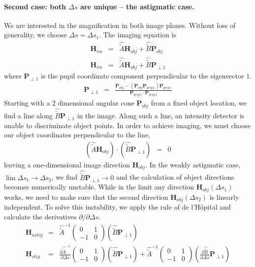 \documentclass[12pt,a4paper,twoside,openright,BCOR10mm,headsepline,titlepage,abstracton,chapterprefix,final]{scrreprt}
\newcommand\Vector[1]{{\mathbf{#1}}}
\begin{document}
\paragraph{Second case: both $\Delta s$ are unique -- the astigmatic case.}
We are interested in the magnification in both image planes. 
Without loss of generality, we choose $\Delta s = \Delta s_1$.
The imaging equation is
\begin{eqnarray}
 \Vector{H}_{im} &=& \hat{\tilde{A}} \Vector{H}_{obj} + \hat{\tilde{B}} \Vector{P}_{obj} \\
 \Vector{H}_{im} &=& \hat{\tilde{A}} \Vector{H}_{obj} + \hat{\tilde{B}} \Vector{P}_{\perp1}
\end{eqnarray}
where $\Vector{P}_{\perp1}$ is the pupil coordinate component perpendicular to the eigenvector $1$.
\begin{eqnarray}
 \Vector{P}_{\perp1} &=& \frac{ \Vector{P}_{obj} - (\Vector{P}_{obj} \Vector{P}_{qeig\,1}) \Vector{P}_{qeig\,1}}
                              { \Vector{P}_{qeig\,1} \cdot \Vector{P}_{qeig\,1} }
\end{eqnarray}
Starting with a 2 dimensional angular cone $\Vector{P}_{obj}$ from a fixed object location, 
we find a line along $\hat{\tilde{B}} \Vector{P}_{\perp1}$ in the image.
Along such a line, an intensity detector is unable to discriminate object points.
In order to achieve imaging, we must choose our object coordinates perpendicular to the line,
\begin{eqnarray}
 \left( \hat{\tilde{A}} \Vector{H}_{obj} \right)
 \cdot
 \left( \hat{\tilde{B}} \Vector{P}_{\perp1} \right) 
 &=& 0
\end{eqnarray}
leaving a one-dimensional image direction $\Vector{H}_{obj}$.
In the weakly astigmatic case, $\lim \Delta s_1 \to \Delta s_2$, 
we find $\hat{\tilde{B}} \Vector{P}_{\perp1} \to 0$ 
and the calculation of object directions becomes numerically unstable.
While in the limit any direction $\Vector{H}_{obj}(\Delta s_1)$ works, 
we need to make sure that the second direction $\Vector{H}_{obj}(\Delta s_2)$ is linearly independent.
To solve this instability, we apply the rule of de l'H\^{o}pital and calculate the derivatives $\partial/\partial \Delta s$.
\begin{eqnarray}
 \Vector{H}_{astig} &=& 
   \hat{\tilde{A}}^{-1}
   \begin{pmatrix}
     0 & 1 \\
    -1 & 0
   \end{pmatrix}
   \left( \hat{\tilde{B}} \Vector{P}_{\perp1} \right) 
 \\
 \Vector{H}_{stig} &=&
   \frac{\partial \hat{\tilde{A}}^{-1}}{\partial \Delta s}
   \begin{pmatrix}
     0 & 1 \\
    -1 & 0
   \end{pmatrix}
   \left( \hat{\tilde{B}} \Vector{P}_{\perp1} \right) 
   +
   \hat{\tilde{A}}^{-1}
   \begin{pmatrix}
     0 & 1 \\
    -1 & 0
   \end{pmatrix}
   \left( \frac{\partial \hat{\tilde{B}}}{\partial \Delta s} \Vector{P}_{\perp1} \right)
\end{eqnarray}
\end{document}

